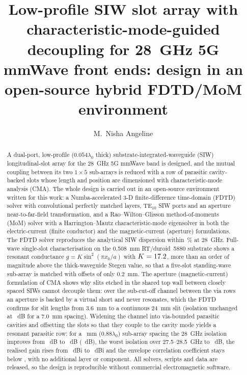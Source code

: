 \documentclass[preprint,12pt]{elsarticle}
\begin{document}
\begin{frontmatter}

\title{Low-profile SIW slot array with characteristic-mode-guided decoupling for 28~GHz 5G mmWave front ends: design in an open-source hybrid FDTD/MoM environment}

\author[vcet]{M.~Nisha Angeline}

\begin{abstract}
A dual-port, low-profile ($0.054\lambda_0$ thick) substrate-integrated-waveguide (SIW) longitudinal-slot array for the 28~GHz 5G mmWave band is designed, and the mutual coupling between its two $1\times5$ sub-arrays is reduced with a row of parasitic cavity-backed slots whose length and position are dimensioned with characteristic-mode analysis (CMA). The whole design is carried out in an open-source environment written for this work: a Numba-accelerated 3-D finite-difference time-domain (FDTD) solver with convolutional perfectly matched layers, TE$_{10}$ SIW ports and an aperture near-to-far-field transformation, and a Rao--Wilton--Glisson method-of-moments (MoM) solver with a Harrington--Mautz characteristic-mode eigensolver in both the electric-current (finite conductor) and the magnetic-current (aperture) formulations. The FDTD solver reproduces the analytical SIW dispersion within \betaErr\,\% at 28~GHz. Full-wave single-slot characterisation on the \SI{0.508}{mm} RT/duroid~5880 substrate shows a resonant conductance $g = K\sin^2(\pi x_0/a)$ with $K = 17.2$, more than an order of magnitude above the thick-waveguide Stegen value, so that a five-slot standing-wave sub-array is matched with offsets of only \SI{0.2}{mm}. The aperture (magnetic-current) formulation of CMA shows why slits etched in the shared top wall between closely spaced SIWs cannot decouple them: over the sub-cut-off channel between the via rows an aperture is backed by a virtual short and never resonates, which the FDTD confirms for slit lengths from 3.6~mm to a continuous 24~mm slit (isolation unchanged at \IsoSeventy~dB for a \SI{7.0}{mm} spacing). Widening the channel into via-bounded parasitic cavities and offsetting the slots so that they couple to the cavity mode yields a resonant parasitic row: for a \Dfin~mm ($0.88\lambda_0$) sub-array spacing the 28~GHz isolation improves from \IsoRefTwentyEight~dB to \IsoDecTwentyEight~dB (\IsoGain~dB), the worst isolation over 27.5--28.5~GHz to \IsoDecMin~dB, the realised gain rises from \GainRef~dBi to \GainDec~dBi and the envelope correlation coefficient stays below \ECCdec, with no additional layer or component. All solvers, scripts and data are released, so the design is reproducible without commercial electromagnetic software.
\end{abstract}


\end{frontmatter}
\end{document}
